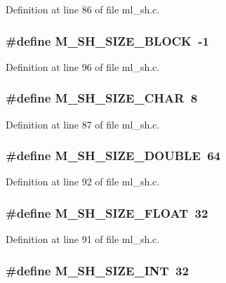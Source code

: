 Definition at line 86 of file ml\_\-sh.c.
\subsubsection{\setlength{\rightskip}{0pt plus 5cm}\#define M\_\-SH\_\-SIZE\_\-BLOCK~-1}\label{ml__sh_8c_0d03b9af347795c70dfba16570f95e75}




Definition at line 96 of file ml\_\-sh.c.
\subsubsection{\setlength{\rightskip}{0pt plus 5cm}\#define M\_\-SH\_\-SIZE\_\-CHAR~8}\label{ml__sh_8c_338eea8edbe507eaed0333c4bfd70a0c}




Definition at line 87 of file ml\_\-sh.c.
\subsubsection{\setlength{\rightskip}{0pt plus 5cm}\#define M\_\-SH\_\-SIZE\_\-DOUBLE~64}\label{ml__sh_8c_b00a49d04b64376849f4f5cff3bdafb7}




Definition at line 92 of file ml\_\-sh.c.
\subsubsection{\setlength{\rightskip}{0pt plus 5cm}\#define M\_\-SH\_\-SIZE\_\-FLOAT~32}\label{ml__sh_8c_427c4246977236a6f1bd6be35c15f9cb}




Definition at line 91 of file ml\_\-sh.c.
\subsubsection{\setlength{\rightskip}{0pt plus 5cm}\#define M\_\-SH\_\-SIZE\_\-INT~32}\label{ml__sh_8c_9971ae92edff3a015f04b64d0a54a377}





